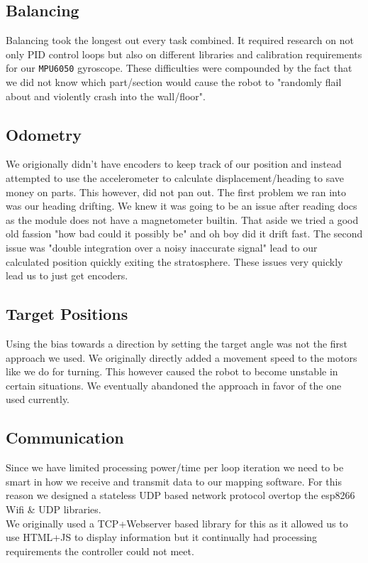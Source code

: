 \documentclass[12pt]{article}
\begin{document}
\subsection{Balancing}
Balancing took the longest out every task combined. It required research on not only PID control loops but also on different libraries and calibration requirements for our \texttt{MPU6050} gyroscope. These difficulties were compounded by the fact that we did not know which part/section would cause the robot to "randomly flail about and violently crash into the wall/floor". 

\subsection{Odometry}
We origionally didn't have encoders to keep track of our position and instead attempted to use the accelerometer to calculate displacement/heading to save money on parts. This however, did not pan out. The first problem we ran into was our heading drifting. We knew it was going to be an issue after reading docs as the module does not have a magnetometer builtin. That aside we tried a good old fassion "how bad could it possibly be" and oh boy did it drift fast. The second issue was "double integration over a noisy inaccurate signal" lead to our calculated position quickly exiting the stratosphere. These issues very quickly lead us to just get encoders.

\subsection{Target Positions}
Using the bias towards a direction by setting the target angle was not the first approach we used. We originally directly added a movement speed to the motors like we do for turning. This however caused the robot to become unstable in certain situations. We eventually abandoned the approach in favor of the one used currently.

\subsection{Communication}
Since we have limited processing power/time per loop iteration we need to be smart in how we receive and transmit data to our mapping software. For this reason we designed a stateless UDP based network protocol overtop the esp8266 Wifi \& UDP libraries. \cite{wifi_lib}\\

We originally used a TCP+Webserver based library for this as it allowed us to use HTML+JS to display information but it continually had processing requirements the controller could not meet.
\end{document}
